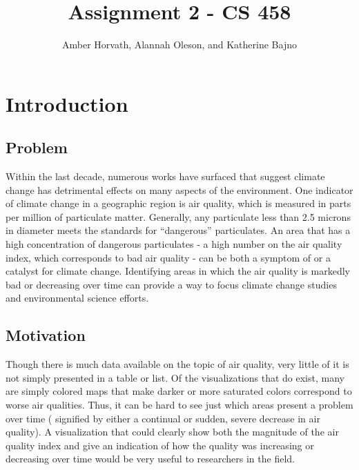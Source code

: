 \documentclass[journal]{vgtc}                %
\title{Assignment 2 - CS 458}
\author{Amber Horvath, Alannah Oleson, and Katherine Bajno}
\begin{document}


\maketitle

\section{Introduction} %

\subsection{Problem}
Within the last decade, numerous works have surfaced that suggest climate change has detrimental effects on many 
aspects of the environment. One indicator of climate change in a geographic region is air quality, which is measured 
in parts per million of particulate matter. Generally, any particulate less than 2.5 microns in diameter meets the 
standards for “dangerous” particulates. An area that has a high concentration of dangerous particulates - a high 
number on the air quality index, which corresponds to bad air quality - can be both a symptom of or a catalyst for 
climate change. Identifying areas in which the air quality is markedly bad or decreasing over time can provide a way 
to focus climate change studies and environmental science efforts.

\subsection{Motivation}
Though there is much data available on the topic of air quality, very little of it is not simply presented in a table 
or list. Of the visualizations that do exist, many are simply colored maps that make darker or more saturated colors 
correspond to worse air qualities. Thus, it can be hard to see just which areas present a problem over time (
signified by either a continual or sudden, severe decrease in air quality). A visualization that could clearly show 
both the magnitude of the air quality index and give an indication of how the quality was increasing or decreasing 
over time would be very useful to researchers in the field.
\end{document}
